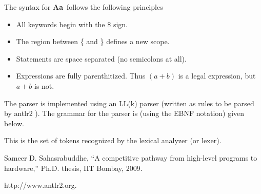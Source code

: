 \documentclass{article}
\newcommand{\Aa}{{\bf Aa}~}
\begin{document}
The syntax for \Aa follows the following
principles
\begin{itemize}
\item All keywords begin with the \$ sign.
\item The region between \{ and \} defines a new scope.
\item Statements are space separated (no semicolons at all).
\item Expressions are fully parenthitized.  Thus
$(a + b)$ is a legal expression, but $a+b$ is not.
\end{itemize}


The parser is implemented using 
an LL(k) parser (written as rules to be parsed by antlr2 \cite{ref:antlr2}).
The grammar for the parser is (using the EBNF notation) given below. 


This is the set of tokens recognized by the lexical analyzer (or lexer).


\begin{thebibliography}{99}
Sameer D. Sahasrabuddhe,
``A competitive pathway from high-level programs to hardware,''
Ph.D. thesis, IIT Bombay, 2009.

http://www.antlr2.org.
\end{thebibliography}
\end{document}
